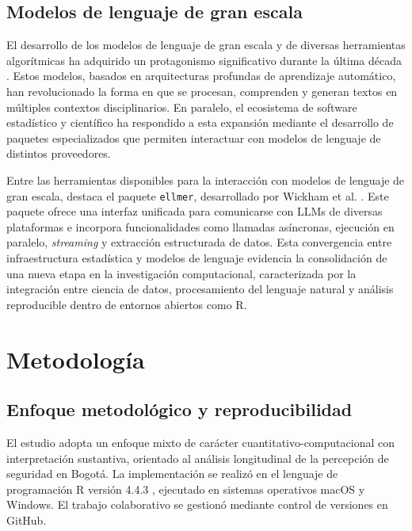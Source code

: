 \documentclass[sn-basic,pdflatex]{sn-jnl}
\theoremstyle{remark}
\theoremstyle{definition}
\begin{document}
\subsection{Modelos de lenguaje de gran
escala}\label{modelos-de-lenguaje-de-gran-escala}

El desarrollo de los modelos de lenguaje de gran escala y de diversas
herramientas algorítmicas ha adquirido un protagonismo significativo
durante la última década \citep{murray2020}. Estos modelos, basados en
arquitecturas profundas de aprendizaje automático, han revolucionado la
forma en que se procesan, comprenden y generan textos en múltiples
contextos disciplinarios. En paralelo, el ecosistema de software
estadístico y científico ha respondido a esta expansión mediante el
desarrollo de paquetes especializados que permiten interactuar con
modelos de lenguaje de distintos proveedores.

Entre las herramientas disponibles para la interacción con modelos de
lenguaje de gran escala, destaca el paquete \texttt{ellmer},
desarrollado por Wickham et al. \citep{wickham2025ellmer}. Este paquete
ofrece una interfaz unificada para comunicarse con LLMs de diversas
plataformas e incorpora funcionalidades como llamadas asíncronas,
ejecución en paralelo, \emph{streaming} y extracción estructurada de
datos. Esta convergencia entre infraestructura estadística y modelos de
lenguaje evidencia la consolidación de una nueva etapa en la
investigación computacional, caracterizada por la integración entre
ciencia de datos, procesamiento del lenguaje natural y análisis
reproducible dentro de entornos abiertos como R.

\section{Metodología}\label{metodologuxeda}

\subsection{Enfoque metodológico y
reproducibilidad}\label{enfoque-metodoluxf3gico-y-reproducibilidad}

El estudio adopta un enfoque mixto de carácter
cuantitativo-computacional con interpretación sustantiva, orientado al
análisis longitudinal de la percepción de seguridad en Bogotá. La
implementación se realizó en el lenguaje de programación R versión 4.4.3
\citep{rcore2025}, ejecutado en sistemas operativos macOS y Windows. El
trabajo colaborativo se gestionó mediante control de versiones en
GitHub.
\end{document}
